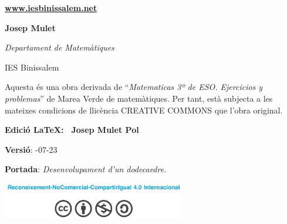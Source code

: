 \begin{center}
\begin{minipage}{0.4\textwidth}
\begin{center}
	\small
	
	\noindent \href{www.iesbinissalem.net}{\textbf{www.iesbinissalem.net}}  
 
\end{center}
\end{minipage}
\begin{minipage}{0.4\textwidth}
\begin{flushright}
\textbf{Josep Mulet}

\textit{Departament de Matemàtiques} 

 IES Binissalem
\end{flushright}
\end{minipage} 


\end{center}

\newpage

\vspace*{12.5cm}
 \begin{center}
 	\begin{minipage}{0.5\textwidth}
 		Aquesta és una obra derivada de ``\textit{Matematicas 3º de ESO. Ejercicios y problemas}'' de Marea Verde de matemàtiques. Per tant, està subjecta a les mateixes condicions de llicència CREATIVE COMMONS que l'obra original.
 		
 		 \noindent \textbf{Edició \LaTeX: \quad \textregistered \,  Josep Mulet Pol}
 		
 		 \noindent \textbf{Versió}: -07-23
 		 
 		 \noindent \textbf{Portada}: \quad \textit{Desenvolupament d'un dodecaedre}.
 		 
 		
 		\begin{center}
 		\includegraphics*[width=8cm]{img-00/licencia}
 		\end{center}
 	\end{minipage}
 \end{center}
 

\renewcommand{\thepage}{\Roman{page}}%
\pagestyle{myheadings}
\thispagestyle{empty}
\renewcommand{\headrulewidth}{0pt}
\renewcommand{\footrulewidth}{0pt}

\pagebreak



